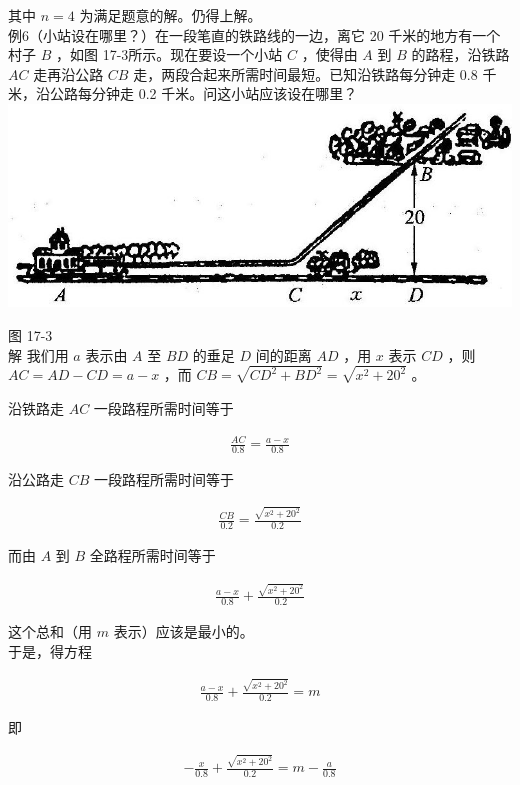 \documentclass[10pt]{article}
\begin{document}
其中 $n=4$ 为满足题意的解。仍得上解。\\
例6（小站设在哪里？）在一段笔直的铁路线的一边，离它 20 千米的地方有一个村子 $B$ ，如图 17-3所示。现在要设一个小站 $C$ ，使得由 $A$ 到 $B$ 的路程，沿铁路 $A C$ 走再沿公路 $C B$ 走，两段合起来所需时间最短。已知沿铁路每分钟走 0.8 千米，沿公路每分钟走 0.2 千米。问这小站应该设在哪里？\\
\includegraphics[max width=\textwidth, center]{2024_10_30_26b590fd1106d28139f0g-114}

图 17-3\\
解 我们用 $a$ 表示由 $A$ 至 $B D$ 的垂足 $D$ 间的距离 $A D$ ，用 $x$ 表示 $C D$ ，则 $A C=A D-C D=a-x$ ，而 $C B=\sqrt{C D^{2}+B D^{2}}=\sqrt{x^{2}+20^{2}}$ 。

沿铁路走 $A C$ 一段路程所需时间等于

\begin{align*}
\frac{A C}{0.8}=\frac{a-x}{0.8}
\end{align*}

沿公路走 $C B$ 一段路程所需时间等于

\begin{align*}
\frac{C B}{0.2}=\frac{\sqrt{x^{2}+20^{2}}}{0.2}
\end{align*}

而由 $A$ 到 $B$ 全路程所需时间等于

\begin{align*}
\frac{a-x}{0.8}+\frac{\sqrt{x^{2}+20^{2}}}{0.2}
\end{align*}

这个总和（用 $m$ 表示）应该是最小的。\\
于是，得方程

\begin{align*}
\frac{a-x}{0.8}+\frac{\sqrt{x^{2}+20^{2}}}{0.2}=m
\end{align*}

即

\begin{align*}
-\frac{x}{0.8}+\frac{\sqrt{x^{2}+20^{2}}}{0.2}=m-\frac{a}{0.8}
\end{align*}
\end{document}
